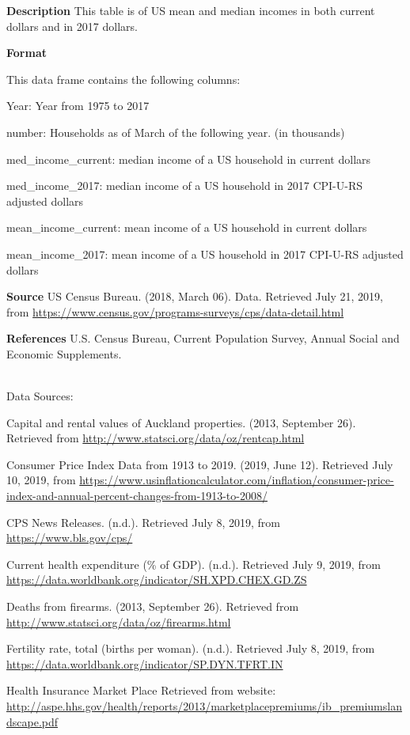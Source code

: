 \documentclass[
]{book}
\begin{document}
\textbf{Description}
This table is of US mean and median incomes in both current dollars and in 2017 dollars.

\textbf{Format}

This data frame contains the following columns:

Year: Year from 1975 to 2017

number: Households as of March of the following year. (in thousands)

med\_income\_current: median income of a US household in current dollars

med\_income\_2017: median income of a US household in 2017 CPI-U-RS adjusted dollars

mean\_income\_current: mean income of a US household in current dollars

mean\_income\_2017: mean income of a US household in 2017 CPI-U-RS adjusted dollars

\textbf{Source}
US Census Bureau. (2018, March 06). Data. Retrieved July 21, 2019, from \url{https://www.census.gov/programs-surveys/cps/data-detail.html}

\textbf{References}
U.S. Census Bureau, Current Population Survey, Annual Social and Economic Supplements.

\textbf{\\
}
Data Sources:

Capital and rental values of Auckland properties. (2013, September 26). Retrieved from
\url{http://www.statsci.org/data/oz/rentcap.html}

Consumer Price Index Data from 1913 to 2019. (2019, June 12). Retrieved July 10, 2019, from \url{https://www.usinflationcalculator.com/inflation/consumer-price-index-and-annual-percent-changes-from-1913-to-2008/}

CPS News Releases. (n.d.). Retrieved July 8, 2019, from \url{https://www.bls.gov/cps/}

Current health expenditure (\% of GDP). (n.d.). Retrieved July 9, 2019, from \url{https://data.worldbank.org/indicator/SH.XPD.CHEX.GD.ZS}

Deaths from firearms. (2013, September 26). Retrieved from
\url{http://www.statsci.org/data/oz/firearms.html}

Fertility rate, total (births per woman). (n.d.). Retrieved July 8, 2019, from \url{https://data.worldbank.org/indicator/SP.DYN.TFRT.IN}

Health Insurance Market Place Retrieved from website:
\url{http://aspe.hhs.gov/health/reports/2013/marketplacepremiums/ib_premiumslandscape.pdf}
\end{document}
